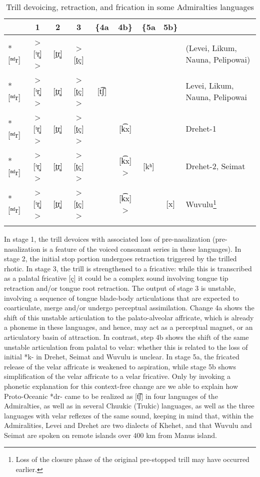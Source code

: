\documentclass[output=paper]{langscibook}
\begin{document}
\begin{table}%
\caption{Trill devoicing, retraction, and frication in some Admiralties languages}
\label{tab:ex:blevins:15}
\small
\begin{tabularx}{\textwidth}{X@{~}c@{~}c@{~}c@{~}c@{~}c@{~}c@{~}cl}
 \lsptoprule
         &    1     &  2   &    3                 & \{4a  &  4b\} &  \{5a   &  5b\}\\\midrule
  *[ⁿᵈr] & > [ᵗr̥] > & [t̠r̥] & > [t̠ç]  \phantom{>}  &       &       &         &     &   (Levei, Likum, Nauna, Pelipowai)\\
  *[ⁿᵈr] & > [ᵗr̥] > & [t̠r̥] & > [t̠ç]  >            & \phantom{\{}[t͡ʃ]  &       &         &     &    Levei, Likum, Nauna, Pelipowai\\
  *[ⁿᵈr] & > [ᵗr̥] > & [t̠r̥] & > [t̠ç]  >            &       & [k͡x] \phantom{>}  &         &     &   Drehet-1\\
  *[ⁿᵈr] & > [ᵗr̥] > & [t̠r̥] & > [t̠ç]  >            &       & [k͡x] >            &   [kʰ] &     &   Drehet-2, Seimat\\
  *[ⁿᵈr] & > [ᵗr̥] > & [t̠r̥] & > [t̠ç]  >            &       & [k͡x] >            &        & [x] &   Wuvulu\footnote{Loss of the closure phase of the original pre-stopped trill may have occurred earlier.}\\
  \lspbottomrule
\end{tabularx}
\end{table}

In stage 1, the trill devoices with associated loss of pre-nasalization (pre\hyp nasalization is a feature of the voiced consonant series in these languages). In stage 2, the initial stop portion undergoes retraction triggered by the trilled rhotic. In stage 3, the trill is strengthened to a fricative: while this is transcribed as a palatal fricative [ç] it could be a complex sound involving tongue tip retraction and/or tongue root retraction. The output of stage 3 is unstable, involving a sequence of tongue blade-body articulations that are expected to coarticulate, merge and/or undergo perceptual assimilation. Change 4a shows the shift of this unstable articulation to the palato-alveolar affricate, which is already a phoneme in these languages, and hence, may act as a perceptual magnet, or an articulatory basin of attraction. In contrast, step 4b shows the shift of the same unstable articulation from palatal to velar: whether this is related to the loss of initial *k- in Drehet, Seimat and Wuvulu is unclear. In stage 5a, the fricated release of the velar affricate is weakened to aspiration, while stage 5b shows simplification of the velar affricate to a velar fricative. Only by invoking a phonetic explanation for this context-free change are we able to explain how Proto-Oceanic *dr- came to be realized as [t͡ʃ] in four languages of the Admiralties, as well as in several Chuukic (Trukic) languages, as well as the three languages with velar reflexes of the same sound, keeping in mind that, within the Admiralities, Levei and Drehet are two dialects of Khehet, and that Wuvulu and Seimat are spoken on remote islands over 400 km from Manus island.
\end{document}
